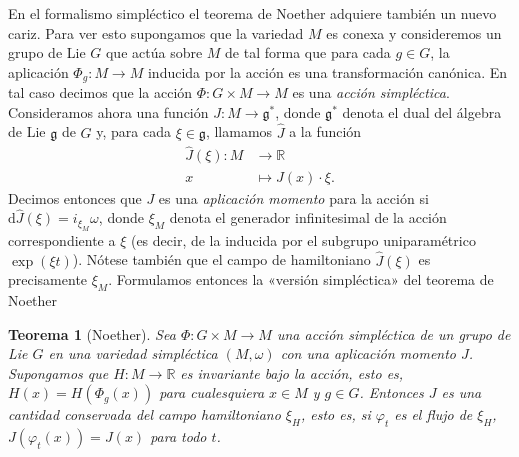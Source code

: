 \documentclass[12pt,a4paper,twocolumn,reqno]{amsart}
\newtheorem{thm}{Teorema}[section]
\theoremstyle{definition} \newtheorem{defn}[thm]{Definición}
\theoremstyle{definition} \newtheorem{ejemplo}[thm]{Ejemplo}
\theoremstyle{definition} \newtheorem{ejercicio}[thm]{Ejercicio}
\theoremstyle{remark} \newtheorem*{obs}{Observación}
\def\RR{\mathbb{R}}
\def\dd{\mathrm{d}}
\def\gg{\mathfrak{g}}
\begin{document}
En el formalismo simpléctico el teorema de Noether adquiere también un nuevo cariz. Para ver esto supongamos que la variedad $M$ es conexa y consideremos un grupo de Lie $G$ que actúa sobre $M$ de tal forma que para cada $g\in G$, la aplicación $\Phi_g:M\rightarrow M$ inducida por la acción es una transformación canónica. En tal caso decimos que la acción $\Phi:G\times M\rightarrow M$ es una \emph{acción simpléctica}. Consideramos ahora una función $J:M\rightarrow \gg^*$, donde $\gg^*$ denota el dual del álgebra de Lie $\gg$ de $G$ y, para cada $\xi\in \gg$, llamamos $\hat{J}$ a la función
\begin{align*}
  \hat{J}(\xi) :M&\longrightarrow \RR\\ 
     x &\longmapsto J(x)\cdot \xi.
  \end{align*}
  Decimos entonces que $J$ es una \emph{aplicación momento} para la acción si $\dd \hat{J}(\xi)=i_{\xi_M}\omega$, donde $\xi_M$ denota el generador infinitesimal de la acción correspondiente a $\xi$ (es decir, de la inducida por el subgrupo uniparamétrico $\exp(\xi t)$). Nótese también que el campo de hamiltoniano $\hat{J}(\xi)$ es precisamente $\xi_M$. Formulamos entonces la «versión simpléctica» del teorema de Noether 
  \begin{thm}[Noether]
    Sea $\Phi:G\times M \rightarrow M$ una acción simpléctica de un grupo de Lie $G$ en una variedad simpléctica $(M,\omega)$ con una aplicación momento $J$. Supongamos que $H:M\rightarrow \RR$ es invariante bajo la acción, esto es, $H(x)=H(\Phi_g(x))$ para cualesquiera $x\in M$ y $g\in G$. Entonces $J$ es una cantidad conservada del campo hamiltoniano $\xi_H$, esto es, si $\varphi_t$ es el flujo de $\xi_H$, $J(\varphi_t(x))=J(x)$ para todo $t$.
  \end{thm}
\end{document}
